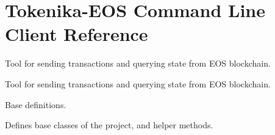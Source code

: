 \hypertarget{group__eosc}{}\section{Tokenika-\/\+E\+OS Command Line Client Reference}
\label{group__eosc}


Tool for sending transactions and querying state from E\+OS blockchain.  


Tool for sending transactions and querying state from E\+OS blockchain. 

Base definitions.

Defines base classes of the project, and helper methods. 